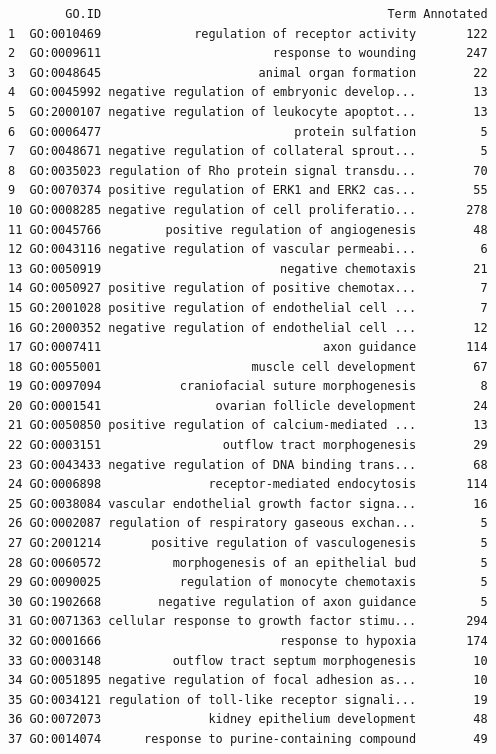 \documentclass[]{article}
\begin{document}
\begin{verbatim}
        GO.ID                                        Term Annotated
1  GO:0010469             regulation of receptor activity       122
2  GO:0009611                        response to wounding       247
3  GO:0048645                      animal organ formation        22
4  GO:0045992 negative regulation of embryonic develop...        13
5  GO:2000107 negative regulation of leukocyte apoptot...        13
6  GO:0006477                           protein sulfation         5
7  GO:0048671 negative regulation of collateral sprout...         5
8  GO:0035023 regulation of Rho protein signal transdu...        70
9  GO:0070374 positive regulation of ERK1 and ERK2 cas...        55
10 GO:0008285 negative regulation of cell proliferatio...       278
11 GO:0045766         positive regulation of angiogenesis        48
12 GO:0043116 negative regulation of vascular permeabi...         6
13 GO:0050919                         negative chemotaxis        21
14 GO:0050927 positive regulation of positive chemotax...         7
15 GO:2001028 positive regulation of endothelial cell ...         7
16 GO:2000352 negative regulation of endothelial cell ...        12
17 GO:0007411                               axon guidance       114
18 GO:0055001                     muscle cell development        67
19 GO:0097094           craniofacial suture morphogenesis         8
20 GO:0001541                ovarian follicle development        24
21 GO:0050850 positive regulation of calcium-mediated ...        13
22 GO:0003151                 outflow tract morphogenesis        29
23 GO:0043433 negative regulation of DNA binding trans...        68
24 GO:0006898               receptor-mediated endocytosis       114
25 GO:0038084 vascular endothelial growth factor signa...        16
26 GO:0002087 regulation of respiratory gaseous exchan...         5
27 GO:2001214       positive regulation of vasculogenesis         5
28 GO:0060572          morphogenesis of an epithelial bud         5
29 GO:0090025           regulation of monocyte chemotaxis         5
30 GO:1902668        negative regulation of axon guidance         5
31 GO:0071363 cellular response to growth factor stimu...       294
32 GO:0001666                         response to hypoxia       174
33 GO:0003148          outflow tract septum morphogenesis        10
34 GO:0051895 negative regulation of focal adhesion as...        10
35 GO:0034121 regulation of toll-like receptor signali...        19
36 GO:0072073               kidney epithelium development        48
37 GO:0014074      response to purine-containing compound        49

\end{verbatim}
\end{document}
